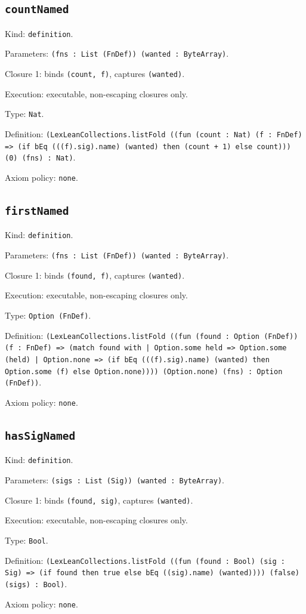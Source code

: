 \documentclass[11pt]{article}
\begin{document}
\subsection*{\texttt{countNamed}}
\noindent Kind: \texttt{definition}.\par
\noindent Parameters: \texttt{(fns : List (FnDef)) (wanted : ByteArray)}.\par
\noindent Closure 1: binds \texttt{(count, f)}, captures \texttt{(wanted)}.\par
\noindent Execution: executable, non-escaping closures only.\par
\noindent Type: \texttt{Nat}.\par
\noindent Definition: \texttt{(LexLeanCollections.listFold ((fun (count : Nat) (f : FnDef) => (if bEq (((f).sig).name) (wanted) then (count + 1) else count))) (0) (fns) : Nat)}.\par
\noindent Axiom policy: \texttt{none}.\par
\subsection*{\texttt{firstNamed}}
\noindent Kind: \texttt{definition}.\par
\noindent Parameters: \texttt{(fns : List (FnDef)) (wanted : ByteArray)}.\par
\noindent Closure 1: binds \texttt{(found, f)}, captures \texttt{(wanted)}.\par
\noindent Execution: executable, non-escaping closures only.\par
\noindent Type: \texttt{Option (FnDef)}.\par
\noindent Definition: \texttt{(LexLeanCollections.listFold ((fun (found : Option (FnDef)) (f : FnDef) => (match found with | Option.some held => Option.some (held) | Option.none => (if bEq (((f).sig).name) (wanted) then Option.some (f) else Option.none)))) (Option.none) (fns) : Option (FnDef))}.\par
\noindent Axiom policy: \texttt{none}.\par
\subsection*{\texttt{hasSigNamed}}
\noindent Kind: \texttt{definition}.\par
\noindent Parameters: \texttt{(sigs : List (Sig)) (wanted : ByteArray)}.\par
\noindent Closure 1: binds \texttt{(found, sig)}, captures \texttt{(wanted)}.\par
\noindent Execution: executable, non-escaping closures only.\par
\noindent Type: \texttt{Bool}.\par
\noindent Definition: \texttt{(LexLeanCollections.listFold ((fun (found : Bool) (sig : Sig) => (if found then true else bEq ((sig).name) (wanted)))) (false) (sigs) : Bool)}.\par
\noindent Axiom policy: \texttt{none}.\par
\end{document}
